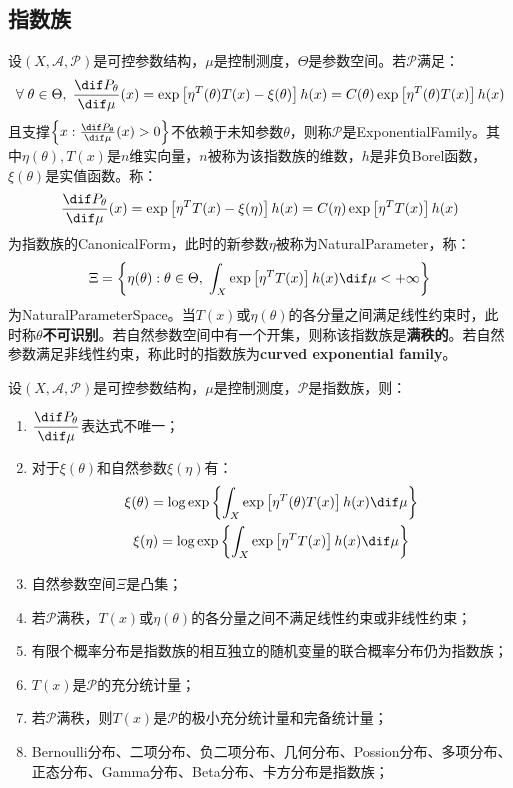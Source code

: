 \subsection{指数族}
\begin{definition}
	设$(X,\mathscr{A},\mathscr{P})$是可控参数结构，$\mu$是控制测度，$\Theta$是参数空间。若$\mathscr{P}$满足：
	\begin{equation*}
		\forall\;\theta\in\Theta,\;\frac{\dif P_{\theta}}{\dif\mu}(x)=\exp\left[\eta^T(\theta)T(x)-\xi(\theta)\right]h(x)=C(\theta)\exp\left[\eta^T(\theta)T(x)\right]h(x)
	\end{equation*}
	且支撑$\left\{x:\frac{\dif P_{\theta}}{\dif\mu}(x)>0\right\}$不依赖于未知参数$\theta$，则称$\mathscr{P}$是\gls{ExponentialFamily}。其中$\eta(\theta),T(x)$是$n$维实向量，$n$被称为该指数族的维数，$h$是非负Borel函数，$\xi(\theta)$是实值函数。称：
	\begin{equation*}
		\frac{\dif P_{\theta}}{\dif\mu}(x)=\exp\left[\eta^TT(x)-\xi(\eta)\right]h(x)=C(\eta)\exp\left[\eta^TT(x)\right]h(x)
	\end{equation*}
	为指数族的\gls{CanonicalForm}，此时的新参数$\eta$被称为\gls{NaturalParameter}，称：
	\begin{equation*}
		\Xi=\left\{\eta(\theta):\theta\in\Theta,\;\int_{X}\exp\left[\eta^TT(x)\right]h(x)\dif\mu<+\infty\right\}
	\end{equation*}
	为\gls{NaturalParameterSpace}。当$T(x)$或$\eta(\theta)$的各分量之间满足线性约束时，此时称$\theta$\textbf{不可识别}。若自然参数空间中有一个开集，则称该指数族是\textbf{满秩的}。若自然参数满足非线性约束，称此时的指数族为\textbf{curved exponential family}。
\end{definition}
\begin{property}\label{prop:ExponentialFamily}
	设$(X,\mathscr{A},\mathscr{P})$是可控参数结构，$\mu$是控制测度，$\mathscr{P}$是指数族，则：
	\begin{enumerate}
		\item $\dfrac{\dif P_{\theta}}{\dif\mu}$表达式不唯一；
		\item 对于$\xi(\theta)$和自然参数$\xi(\eta)$有：
		\begin{gather*}
			\xi(\theta)=\log\exp\left\{\int_{X}\exp\left[\eta^T(\theta)T(x)\right]h(x)\dif\mu\right\} \\
			\xi(\eta)=\log\exp\left\{\int_{X}\exp\left[\eta^TT(x)\right]h(x)\dif\mu\right\}
		\end{gather*}
		\item 自然参数空间$\Xi$是凸集；
		\item 若$\mathscr{P}$满秩，$T(x)$或$\eta(\theta)$的各分量之间不满足线性约束或非线性约束；
		\item 有限个概率分布是指数族的相互独立的随机变量的联合概率分布仍为指数族；
		\item $T(x)$是$\mathscr{P}$的充分统计量；
		\item 若$\mathscr{P}$满秩，则$T(x)$是$\mathscr{P}$的极小充分统计量和完备统计量；
		\item Bernoulli分布、二项分布、负二项分布、几何分布、Possion分布、多项分布、正态分布、Gamma分布、Beta分布、卡方分布是指数族；
	\end{enumerate}
\end{property}
